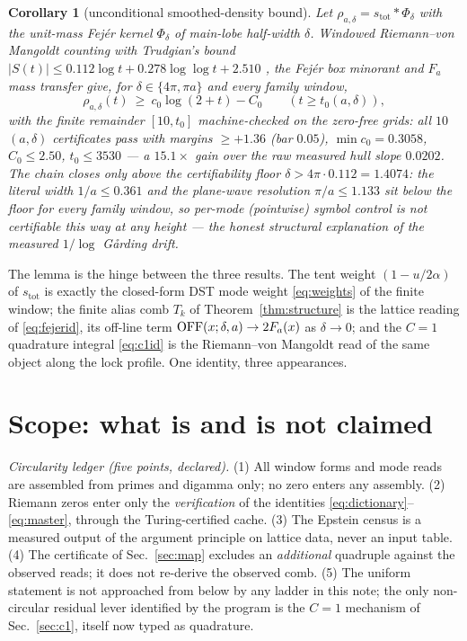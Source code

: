 \documentclass[11pt,a4paper]{article}
\newtheorem{corollary}[theorem]{Corollary}
\theoremstyle{remark}
\begin{document}
\begin{corollary}[unconditional smoothed-density bound]
\label{cor:fejer}
Let $\rho_{a,\delta}=s_{\mathrm{tot}}\ast\Phi_\delta$ with the
unit-mass Fej\'er kernel $\Phi_\delta$ of main-lobe half-width
$\delta$.  Windowed Riemann--von Mangoldt counting with Trudgian's
bound $|S(t)|\le0.112\log t+0.278\log\log t+2.510$ \cite{Tru14}, the
Fej\'er box minorant and $F_a$ mass transfer give, for
$\delta\in\{4\pi,\pi a\}$ and every family window,
\[
\rho_{a,\delta}(t)\ \ge\ c_0\log(2+t)-C_0\qquad(t\ge t_0(a,\delta)),
\]
with the finite remainder $[10,t_0]$ machine-checked on the zero-free
grids: all $10$ $(a,\delta)$ certificates pass with margins
$\ge+1.36$ (bar $0.05$), $\min c_0=0.3058$, $C_0\le2.50$,
$t_0\le3530$ --- a $15.1\times$ gain over the raw measured hull slope
$0.0202$.  The chain closes \emph{only} above the certifiability floor
$\delta>4\pi\cdot0.112=1.4074$: the literal width $1/a\le0.361$ and
the plane-wave resolution $\pi/a\le1.133$ sit below the floor for
every family window, so per-mode (pointwise) symbol control is not
certifiable this way at any height --- the honest structural
explanation of the measured $1/\log$ G\r{a}rding drift.
\end{corollary}

The lemma is the hinge between the three results.  The tent weight
$(1-u/2\alpha)$ of $s_{\mathrm{tot}}$ is exactly the closed-form DST
mode weight \eqref{eq:weights} of the finite window; the finite alias
comb $T_k$ of Theorem~\ref{thm:structure} is the lattice reading of
\eqref{eq:fejerid}, its off-line term ${\rm OFF}(x;\delta,a)\to
2F_a(x)$ as $\delta\to0$; and the $C=1$ quadrature integral
\eqref{eq:c1id} is the Riemann--von Mangoldt read of the same object
along the lock profile.  One identity, three appearances.

\section{Scope: what is and is not claimed}\label{sec:scope}

\emph{Circularity ledger (five points, declared).}  (1) All window
forms and mode reads are assembled from primes and digamma only; no
zero enters any assembly.  (2) Riemann zeros enter only the
\emph{verification} of the identities
\eqref{eq:dictionary}--\eqref{eq:master}, through the Turing-certified
cache.  (3) The Epstein census is a measured output of the argument
principle on lattice data, never an input table.  (4) The certificate
of Sec.~\ref{sec:map} excludes an \emph{additional} quadruple against
the observed reads; it does not re-derive the observed comb.  (5) The
uniform statement is not approached from below by any ladder in this
note; the only non-circular residual lever identified by the program
is the $C=1$ mechanism of Sec.~\ref{sec:c1}, itself now typed as
quadrature.
\end{document}

